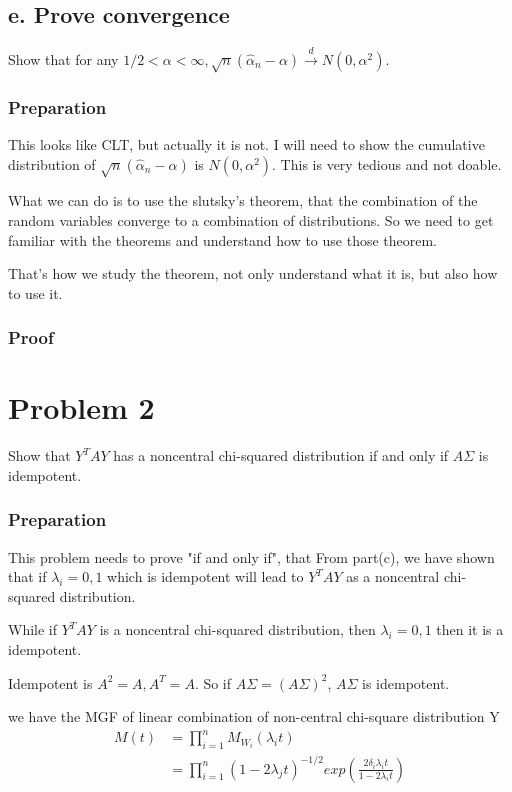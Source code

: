 \documentclass[11pt]{article} %
\begin{document}
\subsection{e. Prove convergence}
Show that for any $1/2 < \alpha < \infty, \sqrt{n} (\hat{\alpha}_n - \alpha) \xrightarrow {d} N(0, \alpha^2)$.

\subsubsection{Preparation}
This looks like CLT, but actually it is not. I will need to show the cumulative distribution of $\sqrt{n} (\hat{\alpha}_n - \alpha) $ is $N(0, \alpha^2)$. This is very tedious and not doable. 

What we can do is to use the slutsky's theorem, that the combination of the random variables converge to a combination of distributions. So we need to get familiar with the theorems and understand how to use those theorem. 

That's how we study the theorem, not only understand what it is, but also how to use it.

\subsubsection{Proof}



\section{Problem 2}
Show that $Y^T A Y$ has a noncentral chi-squared distribution if and only if $A \Sigma$ is idempotent.

\subsubsection{Preparation}
This problem needs to prove "if and only if", that From part(c), we have shown that if $\lambda_i = 0,1$ which is idempotent will lead to $Y^T A Y$ as a noncentral chi-squared distribution. 

While if $Y^T A Y$ is a noncentral chi-squared distribution, then $\lambda_i = 0, 1$ then it is a idempotent. 

Idempotent is $A^2 = A, A^T = A$. So if $A \Sigma = (A \Sigma)^2$, $A \Sigma$ is idempotent. 

we have the MGF of linear combination of non-central chi-square distribution Y
\begin{align*}
	M(t) &= \prod_{i=1}^n M_{W_i}(\lambda_i t)\\
	&=\prod_{i=1}^n  (1-2 \lambda_j t)^{-1/2} exp \left( \frac{ 2 \delta_i \lambda_i t }{1-2 \lambda_i t} \right)
\end{align*}
\end{document}
